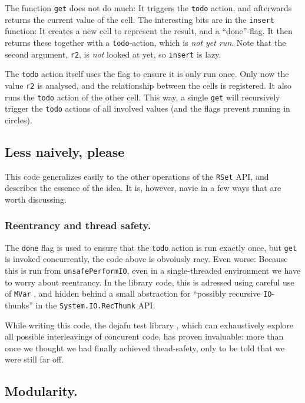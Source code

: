 \documentclass[manuscript,screen,acmsmall]{acmart}
\begin{document}
The function \verb|get| does not do much: It triggers the \verb|todo| action, and afterwards returns the current value of the cell. The interesting bits are in the \verb|insert| function: It creates a new cell to represent the result, and a “done”-flag. It then returns these together with a \verb|todo|-action, which is \emph{not yet run}. Note that the second argument, \verb|r2|, is \emph{not} looked at yet, so \verb|insert| is lazy.

The \verb|todo| action itself uses the flag to ensure it is only run once. Only now the value \verb|r2| is analysed, and the relationship between the cells is registered. It also runs the \verb|todo| action of the other cell. This way, a single \verb|get| will recursively trigger the \verb|todo| actions of all involved values (and the flags prevent running in circles).

\subsection{Less naively, please}

This code generalizes easily to the other operations of the \verb|RSet| API, and describes the essence of the idea. It is, however, navie in a few ways that are worth discussing.

\subsubsection{Reentrancy and thread safety.}\label{sec:thread}

The \verb|done| flag is used to ensure that the \verb|todo| action is run exactly once, but \verb|get| is invoked concurrently, the code above is obvoiusly racy. Even worse: Because this is run from \verb|unsafePerformIO|, even in a single-threaded environment we have to worry about reentrancy. In the library code, this is adressed using careful use of \verb|MVar| \cite{concurrent}, and hidden behind a small abstraction for “possibly recursive \verb|IO|-thunks” in the \verb|System.IO.RecThunk| API.

While writing this code, the dejafu test library \citep{dejafu}, which can exhaustively explore all possible interleavings of concurent code, has proven invaluable: more than once we thought we had finally achieved thead-safety, only to be told that we were still far off.

\subsection{Modularity.}
\end{document}
